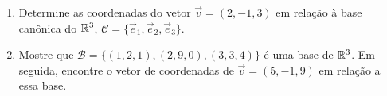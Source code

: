 \begin{frame}[label=lild]{}
\begin{exe}
\begin{enumerate}

\item Determine as coordenadas do vetor $\vec{v}=(2,-1,3)$ em relação à base canônica do $\mathbb{R}^3$, $\mathcal{C}=\{\vec{e}_1,\vec{e}_2,\vec{e}_3\}$.

\item Mostre que $\mathcal{B}=\{(1,2,1),(2,9,0),(3,3,4)\}$ é uma base de $\mathbb{R}^3$. Em seguida, encontre o vetor de coordenadas de $\vec{v}=(5,-1,9)$ em relação a essa base.
\end{enumerate}
\end{exe}
\end{frame}